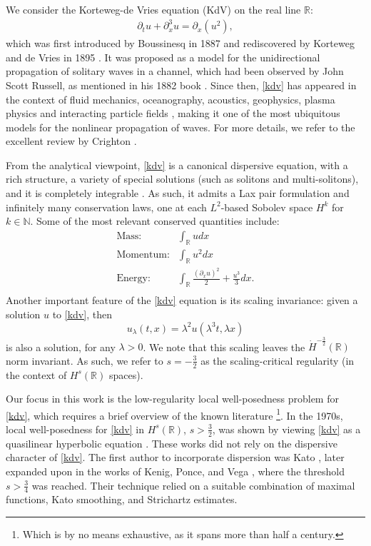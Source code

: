 \documentclass[%
11pt,  reqno]{amsart}
\newcommand{\5}{\textup{V}}
\newcommand{\dx}{\partial_x}
\newcommand{\dt}{\partial_t}
\theoremstyle{remark}
\newcommand{\R}{\mathbb{R}}
\newcommand{\N}{\mathbb{N}}
\numberwithin{equation}{section}
\numberwithin{theorem}{section}
\begin{document}
We consider the Korteweg-de Vries equation (KdV) on the real line $\R$:
	\begin{align}
		\label{kdv}\tag{KdV}
		\dt u + \dx^3 u = \dx(u^2),
	\end{align}
	which was first introduced by Boussinesq in 1887 \cite{Boussinesq} and rediscovered by Korteweg and de Vries in 1895 \cite{KortewegDeVries}. It was proposed as a model for the unidirectional propagation of solitary waves in a channel, which had been observed by John Scott Russell, as mentioned in his 1882 book \cite{Russell}. Since then, \eqref{kdv} has appeared in the context of fluid mechanics, oceanography, acoustics, geophysics, plasma physics and interacting particle fields \cite{Fordy, CCR_particle,  Kuznetsov_Nakoryakov_Pokusaev_Shreiber_1978,    Nezlin, OlsonChristensen, StewartCorones,WashimiTaniuti}, making it one of the most ubiquitous models for the nonlinear propagation of waves. For more details, we refer to the excellent review by Crighton \cite{Crighton}.
	
	\medskip


From the analytical viewpoint, \eqref{kdv} is a canonical dispersive equation, with a rich structure, a variety of special solutions (such as solitons and multi-solitons), and it is completely integrable \cite{ZakharovFadeev}. As such, it admits a Lax pair formulation and infinitely many conservation laws, one at each $L^2$-based Sobolev space $H^k$ for $k\in\N$. Some of the most relevant conserved quantities include:
\begin{align*}
\text{Mass:}& \int_\R u dx\\
\text{Momentum:}& \int_\R u^2 dx\\
\text{Energy:}& \int_\R \frac{(\dx u)^2}{2} + \frac{u^3}{3}  dx.\\
\end{align*}
Another important feature of the \eqref{kdv} equation is its scaling invariance: given a solution $u$ to \eqref{kdv}, then
\begin{equation}\label{scaling}
u_\lambda(t,x)=\lambda^{2}u(\lambda^3 t, \lambda x)
\end{equation}
is also a solution, for any $\lambda>0$. We note that this scaling leaves the $\dot H^{-\frac32}(\R)$ norm invariant. As such, we refer to $s=-\frac32$ as the scaling-critical regularity (in the context of $H^s(\R)$ spaces).  

\medskip

Our focus in this work is the low-regularity local well-posedness problem for \eqref{kdv}, which requires a brief overview of the known literature {\footnote{Which is by no means exhaustive, as it spans more than half a century.}}. In the 1970s, local well-posedness for \eqref{kdv} in $H^s(\R)$, $s>\frac32$, was shown by viewing \eqref{kdv} as a quasilinear hyperbolic equation \cite{BonaSmith, Kato_kdv, SautTemam, TsutsumiMukasa}. These works did not rely on the dispersive character of \eqref{kdv}. The first {author} to incorporate dispersion was Kato \cite{Kato_kdv_disp}, later expanded upon in the works of Kenig, Ponce, and Vega \cite{KPV91, KPV_gkdv}, where {the threshold $s>\frac34$ was reached}. Their technique relied on a suitable combination of maximal functions, Kato smoothing, and Strichartz estimates. 
\end{document}
